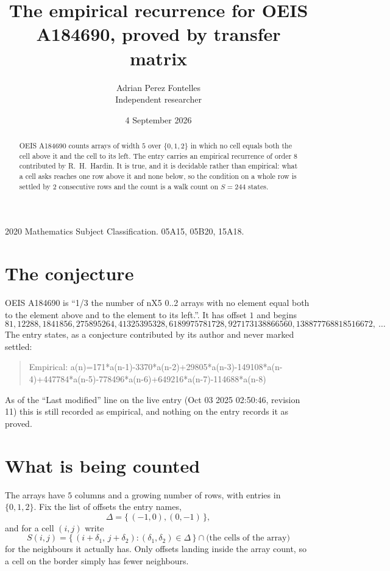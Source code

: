 \documentclass[11pt,a4paper]{article}
\title{The empirical recurrence for OEIS A184690, proved by transfer matrix}
\author{Adrian Perez Fontelles\\ \small Independent researcher}
\date{4 September 2026}
\theoremstyle{plain}
\theoremstyle{definition}
\begin{document}
\maketitle

\begin{abstract}
OEIS A184690 counts arrays of width $5$ over $\{0,1,2\}$ in which no cell equals both the cell above it and the cell to its left. The entry carries an
empirical recurrence of order $8$ contributed by R.~H.~Hardin. It is true, and it is
decidable rather than empirical: what a cell asks reaches one row above
it and none below, so the condition on a whole row is settled by
$2$ consecutive rows and the count is a walk count on $S=244$ states.
\end{abstract}

\noindent\small 2020 Mathematics Subject Classification. 05A15, 05B20, 15A18.\normalsize

\section{The conjecture}

OEIS A184690 is ``1/3 the number of nX5 0..2 arrays with no element equal both to the element above and to the element to its left.''. It has offset $1$ and begins
\[
81, 12288, 1841856, 275895264, 41325395328, 6189975781728, 927173138866560, 138877768818516672,\ \dots
\]
The entry states, as a conjecture contributed by its author and never marked settled:
\begin{quote}
Empirical: a(n)=171*a(n-1)-3370*a(n-2)+29805*a(n-3)-149108*a(n-4)+447784*a(n-5)-778496*a(n-6)+649216*a(n-7)-114688*a(n-8)
\end{quote}
As of the ``Last modified'' line on the live entry (Oct 03 2025 02:50:46, revision 11) this is still
recorded as empirical, and nothing on the entry records it as proved.

\section{What is being counted}

The arrays have $5$ columns and a growing number of rows, with entries in $\{0,1,2\}$. Fix the
list of offsets the entry names,
\[
\Delta=\{\,(-1,0), (0,-1)\,\},
\]
and for a cell $(i,j)$ write
\[
S(i,j)=\{\,(i+\delta_1,\,j+\delta_2) : (\delta_1,\delta_2)\in\Delta\,\}\cap
\text{(the cells of the array)}
\]
for the neighbours it actually has. Only offsets landing inside the array count, so a cell on
the border simply has fewer neighbours.
\end{document}
